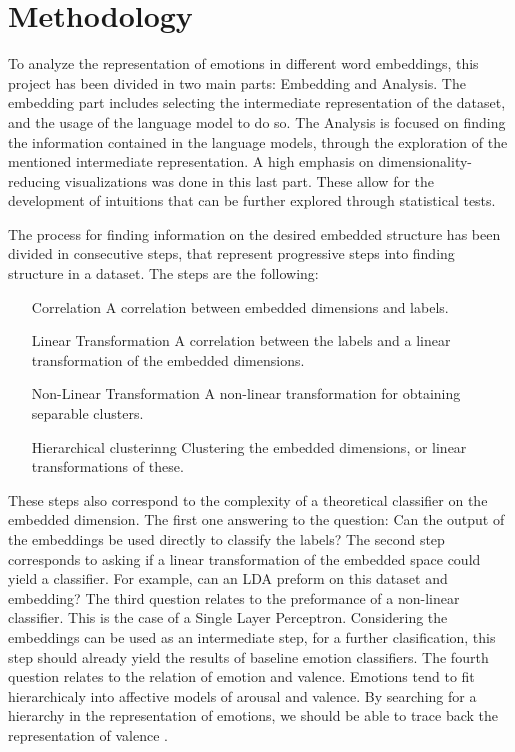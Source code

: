 \chapter{Methodology}\label{chap:Methodology}

To analyze the representation of emotions in different word embeddings, this project has been divided in two main parts: Embedding and Analysis. The embedding part includes selecting the intermediate representation of the dataset, and the usage of the language model to do so. The Analysis is focused on finding the information contained in the language models, through the exploration of the mentioned intermediate representation. A high emphasis on dimensionality-reducing visualizations was done in this last part. These allow for the development of intuitions that can be further explored through statistical tests.

The process for finding information on the desired embedded structure has been divided in consecutive steps, that represent progressive steps into finding structure in a dataset. The steps are the following:

\begin{enumerate}
  \item[Correlation] A correlation between embedded dimensions and labels.
  \item[Linear Transformation] A correlation between the labels and a linear transformation of the embedded dimensions.
  \item[Non-Linear Transformation] A non-linear transformation for obtaining separable clusters.
  \item[Hierarchical clusterinng] Clustering the embedded dimensions, or linear transformations of these.
\end{enumerate}

These steps also correspond to the complexity of a theoretical classifier on the embedded dimension. The first one answering to the question: Can the output of the embeddings be used directly to classify the labels? The second step corresponds to asking if a linear transformation of the embedded space could yield a classifier. For example, can an LDA preform on this dataset and embedding? The third question relates to the preformance of a non-linear classifier. This is the case of a Single Layer Perceptron. Considering the embeddings can be used as an intermediate step, for a further clasification, this step should already yield the results of baseline emotion classifiers. The fourth question relates to the relation of emotion and valence. Emotions tend to fit hierarchicaly into affective models of arousal and valence. \cite{TODO} By searching for a hierarchy in the representation of emotions, we should be able to trace back the representation of valence \cite{TODO}.

